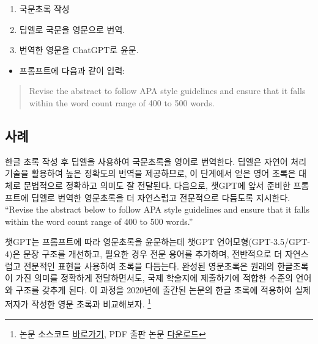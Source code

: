 \documentclass[
  letterpaper,
]{book}
\providecommand{\tightlist}{%
  \setlength{\itemsep}{0pt}\setlength{\parskip}{0pt}}\usepackage{longtable,booktabs,array}
\begin{document}
\begin{tcolorbox}[enhanced jigsaw, opacityback=0, opacitybacktitle=0.6, colback=white, rightrule=.15mm, coltitle=black, colframe=quarto-callout-important-color-frame, colbacktitle=quarto-callout-important-color!10!white, bottomrule=.15mm, bottomtitle=1mm, breakable, title=\textcolor{quarto-callout-important-color}{\faExclamation}\hspace{0.5em}{딥엘과 챗GPT 학술지 영문초록 작성 작업흐름}, titlerule=0mm, leftrule=.75mm, toptitle=1mm, left=2mm, arc=.35mm, toprule=.15mm]

\begin{enumerate}
\def\labelenumi{\arabic{enumi}.}
\tightlist
\item
  국문초록 작성
\item
  딥엘로 국문을 영문으로 번역.
\item
  번역한 영문을 ChatGPT로 윤문.
\end{enumerate}

\begin{itemize}
\tightlist
\item
  프롬프트에 다음과 같이 입력:
\end{itemize}

\begin{quote}
Revise the abstract to follow APA style guidelines and ensure that it
falls within the word count range of 400 to 500 words.
\end{quote}

\end{tcolorbox}

\hypertarget{uxc0acuxb840}{%
\subsection{사례}\label{uxc0acuxb840}}

한글 초록 작성 후 딥엘을 사용하여 국문초록을 영어로 번역한다. 딥엘은
자연어 처리 기술을 활용하여 높은 정확도의 번역을 제공하므로, 이 단계에서
얻은 영어 초록은 대체로 문법적으로 정확하고 의미도 잘 전달된다.
다음으로, 챗GPT에 앞서 준비한 프롬프트에 딥엘로 번역한 영문초록을 더
자연스럽고 전문적으로 다듬도록 지시한다. ``Revise the abstract below to
follow APA style guidelines and ensure that it falls within the word
count range of 400 to 500 words.''

챗GPT는 프롬프트에 따라 영문초록을 윤문하는데 챗GPT
언어모형(GPT-3.5/GPT-4)은 문장 구조를 개선하고, 필요한 경우 전문 용어를
추가하며, 전반적으로 더 자연스럽고 전문적인 표현을 사용하여 초록을
다듬는다. 완성된 영문초록은 원래의 한글초록이 가진 의미를 정확하게
전달하면서도, 국제 학술지에 제출하기에 적합한 수준의 언어와 구조를
갖추게 된다. 이 과정을 2020년에 출간된 논문\autocite{lee2020}의 한글
초록에 적용하여 실제 저자가 작성한 영문 초록과 비교해보자. \footnote{논문
  소스코드
  \href{https://statkclee.github.io/comp_document/automation-kasdba.html}{바로가기},
  PDF 출판 논문
  \href{https://statkclee.github.io/comp_document/data/00006_002_39.pdf}{다운로드}}
\end{document}
